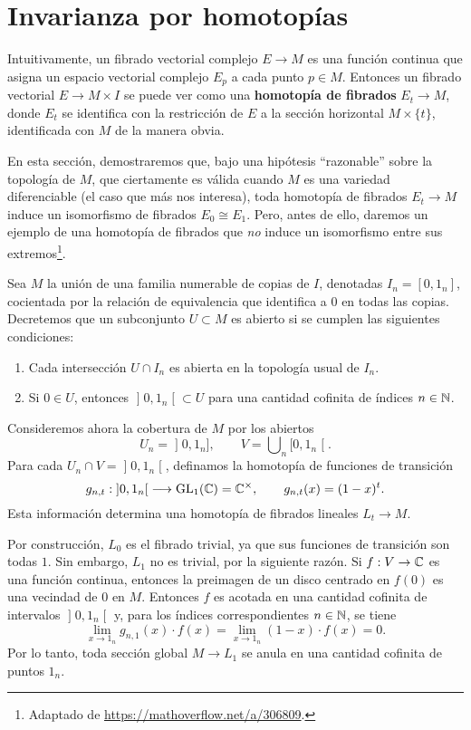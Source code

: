 \section{Invarianza por homotopías}

Intuitivamente, un fibrado vectorial complejo $E \to M$ es una función continua que asigna un espacio vectorial complejo $E_p$ a cada punto $p \in M$. Entonces un fibrado vectorial $E \to M \times I$ se puede ver como una \textbf{homotopía de fibrados} $E_t \to M$, donde $E_t$ se identifica con la restricción de $E$ a la sección horizontal $M \times \{ t \}$, identificada con $M$ de la manera obvia.

En esta sección, demostraremos que, bajo una hipótesis ``razonable'' sobre la topología de $M$, que ciertamente es válida cuando $M$ es una variedad diferenciable (el caso que más nos interesa), toda homotopía de fibrados $E_t \to M$ induce un isomorfismo de fibrados $E_0 \cong E_1$. Pero, antes de ello, daremos un ejemplo de una homotopía de fibrados que \textit{no} induce un isomorfismo entre sus extremos\footnote{Adaptado de \url{https://mathoverflow.net/a/306809}.}.

\begin{example}
Sea $M$ la unión de una familia numerable de copias de $I$, denotadas $I_n = [0, 1_n]$, cocientada por la relación de equivalencia que identifica a $0$ en todas las copias. Decretemos que un subconjunto $U \subset M$ es abierto si se cumplen las siguientes condiciones:
\begin{enumerate}[label=\alph*)]
    \itemsep 0em
    \item Cada intersección $U \cap I_n$ es abierta en la topología usual de $I_n$.
    \item Si $0 \in U$, entonces $\mathopen] 0, 1_n \mathclose[ \subset U$ para una cantidad cofinita de índices $n \in \mathbb N$.
\end{enumerate}

Consideremos ahora la cobertura de $M$ por los abiertos
$$U_n = \mathopen] 0, 1_n \mathclose], \qquad V = \bigcup \nolimits_n \mathopen[ 0, 1_n \mathclose[.$$
Para cada $U_n \cap V = \mathopen] 0, 1_n \mathclose[$, definamos la homotopía de funciones de transición
$$
g_{n,t} : \mathopen] 0, 1_n \mathclose[ \longrightarrow \operatorname{GL}_1(\mathbb C) = \mathbb C^\times, \qquad
g_{n,t}(x) = (1 - x)^t.
$$
Esta información determina una homotopía de fibrados lineales $L_t \to M$.

Por construcción, $L_0$ es el fibrado trivial, ya que sus funciones de transición son todas $1$. Sin embargo, $L_1$ no es trivial, por la siguiente razón. Si $f : V \to \mathbb C$ es una función continua, entonces la preimagen de un disco centrado en $f(0)$ es una vecindad de $0$ en $M$. Entonces $f$ es acotada en una cantidad cofinita de intervalos $\mathopen] 0, 1_n \mathclose[$ y, para los índices correspondientes $n \in \mathbb N$, se tiene
$$\lim_{x \to 1_n} g_{n,1}(x) \cdot f(x) = \lim_{x \to 1_n} (1 - x) \cdot f(x) = 0.$$
Por lo tanto, toda sección global $M \to L_1$ se anula en una cantidad cofinita de puntos $1_n$.
\end{example}

